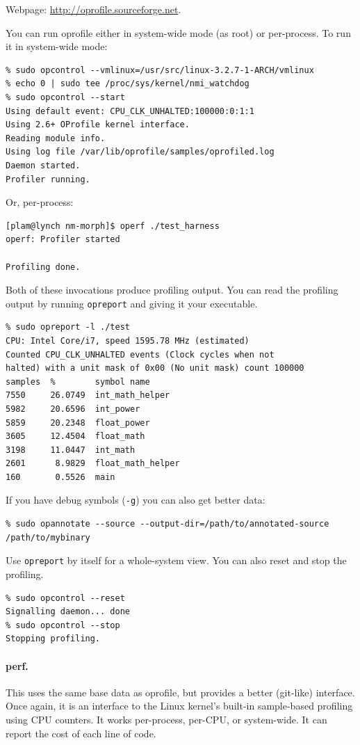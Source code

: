 \documentclass[a4paper]{report}
\begin{document}
Webpage: \url{http://oprofile.sourceforge.net}.

You can run oprofile either in system-wide mode (as root) or per-process. To run it in system-wide mode:
  \begin{lstlisting}
% sudo opcontrol --vmlinux=/usr/src/linux-3.2.7-1-ARCH/vmlinux
% echo 0 | sudo tee /proc/sys/kernel/nmi_watchdog
% sudo opcontrol --start
Using default event: CPU_CLK_UNHALTED:100000:0:1:1
Using 2.6+ OProfile kernel interface.
Reading module info.
Using log file /var/lib/oprofile/samples/oprofiled.log
Daemon started.
Profiler running.
  \end{lstlisting}

Or, per-process:
\begin{lstlisting}
[plam@lynch nm-morph]$ operf ./test_harness
operf: Profiler started

Profiling done.
\end{lstlisting}%

Both of these invocations produce profiling output. You can read the profiling output
by running {\tt opreport} and giving it your executable.

  \begin{lstlisting}
% sudo opreport -l ./test    
CPU: Intel Core/i7, speed 1595.78 MHz (estimated)
Counted CPU_CLK_UNHALTED events (Clock cycles when not
halted) with a unit mask of 0x00 (No unit mask) count 100000
samples  %        symbol name
7550     26.0749  int_math_helper
5982     20.6596  int_power
5859     20.2348  float_power
3605     12.4504  float_math
3198     11.0447  int_math
2601      8.9829  float_math_helper
160       0.5526  main
  \end{lstlisting}
  If you have debug symbols ({\tt -g}) you can also get better data:
  {\small
  \begin{lstlisting}
% sudo opannotate --source --output-dir=/path/to/annotated-source /path/to/mybinary
  \end{lstlisting}
  }

Use {\tt opreport} by itself for a whole-system view.
    You can also reset and stop the profiling.
  \begin{lstlisting}
% sudo opcontrol --reset 
Signalling daemon... done
% sudo opcontrol --stop
Stopping profiling.
  \end{lstlisting}

\paragraph{perf.} This uses the same base data as oprofile, but provides a better
(git-like) interface. Once again, it is an interface to the Linux kernel's built-in
sample-based profiling using CPU counters. It works per-process, per-CPU, or system-wide.
It can report the cost of each line of code.
\end{document}
